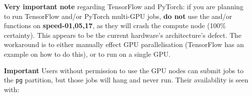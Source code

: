     \noindent
\textbf{Very important note} regarding TensorFlow and PyTorch: 
if you are planning to run TensorFlow and/or PyTorch multi-GPU jobs, 
\textbf{do not} use the  and/or\\
functions on \textbf{speed-01,05,17}, as they will crash the compute node (100\% certainty). 
This appears to be the current hardware's architecture's defect.
%
The workaround is to either
manually effect GPU parallelisation (TensorFlow has an example on how to
do this), or to run on a single GPU.

\vspace{10pt}
\noindent
\textbf{Important}
\vspace{10pt}
Users without permission to use the GPU nodes can submit jobs to the \texttt{pg}
partition, but those jobs will hang and never run.
%
Their availability is seen with:
%

